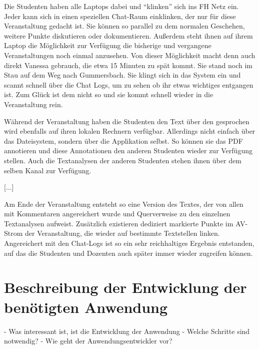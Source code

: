   Die Studenten haben alle Laptops dabei und "`klinken"' sich ins FH Netz ein. Jeder kann sich in einen speziellen Chat-Raum einklinken, der nur für diese Veranstaltung gedacht ist. Sie können so parallel zu dem normalen Geschehen, weitere Punkte diskutieren oder dokumentieren. Außerdem steht ihnen auf ihrem Laptop die Möglichkeit zur Verfügung die bisherige und vergangene Veranstaltungen noch einmal anzusehen. Von dieser Möglichkeit macht denn auch direkt Vanessa gebrauch, die etwa 15 Minuten zu spät kommt. Sie stand noch im Stau auf dem Weg nach Gummersbach. Sie klingt sich in das System ein und scannt schnell über die Chat Logs, um zu sehen ob ihr etwas wichtiges entgangen ist. Zum Glück ist dem nicht so und sie kommt schnell wieder in die Veranstaltung rein.

  Während der Veranstaltung haben die Studenten den Text über den gesprochen wird ebenfalls auf ihren lokalen Rechnern verfügbar. Allerdings nicht einfach über das Dateisystem, sondern über die Applikation selbst. So können sie das PDF annotieren und diese Annotationen den anderen Studenten wieder zur Verfügung stellen. Auch die Textanalysen der anderen Studenten stehen ihnen über dem selben Kanal zur Verfügung.

[...]

  Am Ende der Veranstaltung entsteht so eine Version des Textes, der von allen mit Kommentaren angereichert wurde und Querverweise zu den einzelnen Textanalysen aufweist. Zusätzlich existieren dediziert markierte Punkte im AV-Strom der Veranstaltung, die wieder auf bestimmte Textstellen linken. Angereichert mit den Chat-Logs ist so ein sehr reichhaltiges Ergebnis entstanden, auf das die Studenten und Dozenten auch später immer wieder zugreifen können.




\section{Beschreibung der Entwicklung der benötigten Anwendung} %
\label{sec:beschreibung_der_entwicklung_der_benoetigten_anwendung}

  - Was interessant ist, ist die Entwicklung der Anwendung
  - Welche Schritte sind notwendig?
  - Wie geht der Anwendungsentwickler vor?


